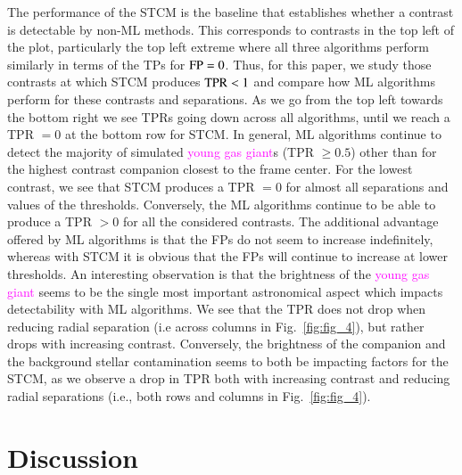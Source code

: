 \documentclass[referee]{aa} %
\newcommand{\newchange}[1]{\textcolor{magenta}{#1}}
\begin{document}
The performance of the STCM is the baseline that establishes whether a contrast is detectable by non-ML methods. 
This corresponds to contrasts in the top left of the plot, particularly the top left extreme where all three algorithms perform similarly in terms of the TPs for ${\rm FP}=0$.
Thus, for this paper, we study those contrasts at which STCM produces ${\rm TPR}<1$ and compare how ML algorithms perform for these contrasts and separations.
As we go from the top left towards the bottom right we see TPRs going down across all algorithms, until we reach a TPR $=0$ at the bottom row for STCM. 
In general, ML algorithms continue to detect the majority of simulated \newchange{young gas giant}s (TPR $\ge 0.5$) other than for the highest contrast companion closest to the frame center.
For the lowest contrast, we see that STCM produces a TPR $=0$ for almost all separations and values of the thresholds.
Conversely, the ML algorithms continue to be able to produce a TPR $>0$ for all the considered contrasts.
The additional advantage offered by ML algorithms is that the FPs do not seem to increase indefinitely, whereas with STCM it is obvious that the FPs will continue to increase at lower thresholds.
An interesting observation is that the brightness of the \newchange{young gas giant} seems to be the single most important astronomical aspect which impacts detectability with ML algorithms.
We see that the TPR does not drop when reducing radial separation (i.e across columns in Fig.~\ref{fig:fig_4}), but rather drops with increasing contrast. 
Conversely,  the brightness of the companion and the background stellar contamination seems to both be impacting factors for the STCM, as we observe a drop in TPR both with increasing contrast and reducing radial separations (i.e., both rows and columns in Fig.~\ref{fig:fig_4}).



\section{Discussion}
\label{sec:discussion}
\end{document}
